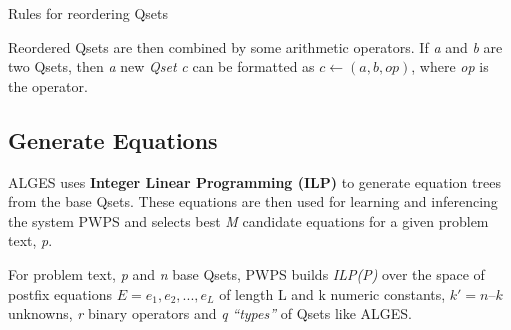\documentclass[document.tex]{subfiles}
\begin{document}
\begin{table}[H]
	\caption{Rules for reordering Qsets\cite{3}}
	\label{tab:rqset}
\end{table}

Reordered Qsets are then combined by some arithmetic operators. If \textit{a} and \textit{ b} are two Qsets, then \textit{a} new \textit{Qset} \textit{c} can be formatted as $c \leftarrow (a, b, op)$, where \textit{op} is the operator.

\subsection{Generate Equations}
ALGES uses \textbf{Integer Linear Programming (ILP)} to generate equation trees from the base Qsets. These equations are then used for learning and inferencing the system PWPS and selects best \textit{M} candidate equations for a given problem text, \textit{p}.

For problem text, \textit{p} and \textit{n} base Qsets, PWPS builds \textit{ILP(P)} over the space of postfix equations $ E = e_1, e_2,...,e_L $ of length L  and k numeric constants, $k'  = n – k$ unknowns, \textit{r} binary operators and \textit{q} \textit{“types”} of Qsets like ALGES.
\end{document}
